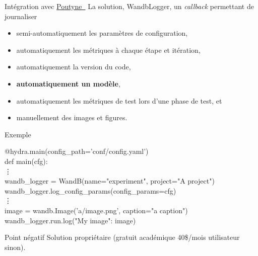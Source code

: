 \documentclass[aspectratio=169,10pt,xcolor=x11names,english,french]{beamer}
\makeatletter
\newenvironment{Scode}{%
	\def\FrameCommand##1{\hskip\@totalleftmargin
		\vrule width 3pt\colorbox{codebg}{\hspace{5pt}##1}%
		\hskip-\linewidth \hskip-\@totalleftmargin \hskip\columnwidth}%
	\MakeFramed {\advance\hsize-\width
		\@totalleftmargin\z@ \linewidth\hsize
		\advance\labelsep\fboxsep
		\@setminipage}%
}{\par\unskip\@minipagefalse\endMakeFramed}
\newcommand{\link}[2]{\href{#1}{#2~{\smaller\faExternalLink*}}}
\makeatother
\begin{document}
	\begin{frame}{Intégration avec \link{https://poutyne.org/}{Poutyne}}
		La solution, \color{bleu}WandbLogger\color{couleurpolice}, un \textit{callback} permettant de journaliser 
		\begin{itemize}
			\item semi-automatiquement les paramètres de configuration,
			\item automatiquement les métriques à chaque étape et itération,
			\item automatiquement la version du code,
			\item \textbf{automatiquement un modèle},
			\item automatiquement les métriques de test lors d'une phase de test, et
			\item manuellement des images et figures.
		\end{itemize}
	\end{frame}
	
	\begin{frame}{Exemple}
		\begin{Scode}
			@hydra.main(config\_path='conf/config.yaml') \\
			def main(cfg): \\
			\quad \vdots \\
			\quad wandb\_logger = WandB(name="experiment", project="A project") \\
			\quad wandb\_logger.log\_config\_params(config\_params=cfg) \\
			\quad \vdots \\
			image = wandb.Image('a/image.png', caption="a caption")\\
			wandb\_logger.run.log({"My image": image})
		\end{Scode}
	\end{frame}
	
	\begin{frame}{Point négatif}
		Solution propriétaire (gratuit académique 40\$/mois utilisateur sinon).
	\end{frame}

		
\end{document}

